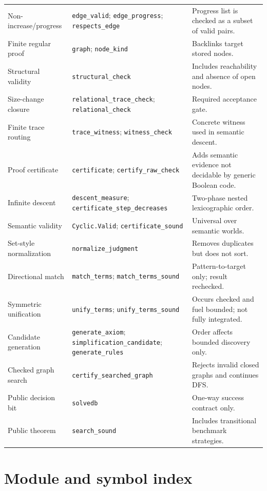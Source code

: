 \documentclass[11pt,oneside]{book}
\DeclareRobustCommand{\code}[1]{\nolinkurl{#1}}
\begin{document}
\begin{longtable}{@{}p{}p{}p{}@{}}
Non-increase/progress & \code{edge_valid}; \code{edge_progress}; \code{respects_edge} & Progress list is checked as a subset of valid pairs.\\
Finite regular proof & \code{graph}; \code{node_kind} & Backlinks target stored nodes.\\
Structural validity & \code{structural_check} & Includes reachability and absence of open nodes.\\
Size-change closure & \code{relational_trace_check}; \code{relational_check} & Required acceptance gate.\\
Finite trace routing & \code{trace_witness}; \code{witness_check} & Concrete witness used in semantic descent.\\
Proof certificate & \code{certificate}; \code{certify_raw_check} & Adds semantic evidence not decidable by generic Boolean code.\\
Infinite descent & \code{descent_measure}; \code{certificate_step_decreases} & Two-phase nested lexicographic order.\\
Semantic validity & \code{Cyclic.Valid}; \code{certificate_sound} & Universal over semantic worlds.\\
Set-style normalization & \code{normalize_judgment} & Removes duplicates but does not sort.\\
Directional match & \code{match_terms}; \code{match_terms_sound} & Pattern-to-target only; result rechecked.\\
Symmetric unification & \code{unify_terms}; \code{unify_terms_sound} & Occurs checked and fuel bounded; not fully integrated.\\
Candidate generation & \code{generate_axiom}; \code{simplification_candidate}; \code{generate_rules} & Order affects bounded discovery only.\\
Checked graph search & \code{certify_searched_graph} & Rejects invalid closed graphs and continues DFS.\\
Public decision bit & \code{solvedb} & One-way success contract only.\\
Public theorem & \code{search_sound} & Includes transitional benchmark strategies.\\
\bottomrule
\end{longtable}

\chapter{Module and symbol index}
\label{app:module-index}
\end{document}

